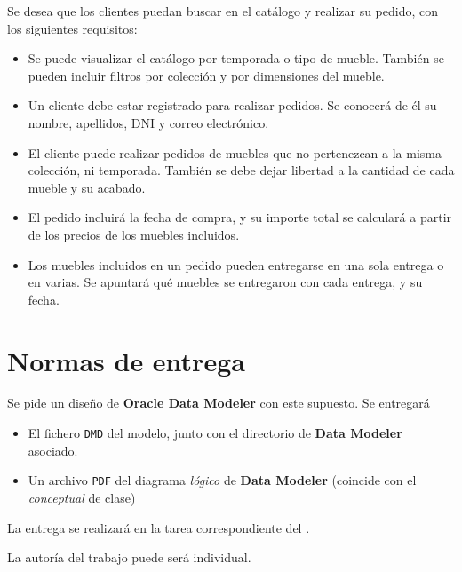 Se desea que los clientes puedan buscar en el catálogo y realizar su pedido, con los siguientes requisitos:
\begin{itemize}
\item Se puede visualizar el catálogo por temporada o tipo de mueble. También se pueden incluir filtros por colección y por dimensiones del mueble.
\item Un cliente debe estar registrado para realizar pedidos. Se conocerá de él su nombre, apellidos, DNI y correo electrónico.
\item El cliente puede realizar pedidos de muebles que no pertenezcan a la misma colección, ni temporada. También se debe dejar libertad a la cantidad de cada mueble y su acabado.
\item El pedido incluirá la fecha de compra, y su importe total se calculará a partir de los precios de los muebles incluidos.
\item Los muebles incluidos en un pedido pueden entregarse en una sola entrega o en varias. Se apuntará qué muebles se entregaron con cada entrega, y su fecha.
\end{itemize}

\section{Normas de entrega}
Se pide un diseño de \textbf{Oracle Data Modeler} con este supuesto. Se entregará
\begin{itemize}
\item  El fichero \texttt{DMD} del modelo, junto con el directorio de \textbf{Data Modeler} asociado.
\item Un archivo \texttt{PDF} del diagrama \textit{lógico} de \textbf{Data Modeler} (coincide con el \textit{conceptual} de clase)
\end{itemize}

La entrega se realizará en la tarea correspondiente del .

La autoría del trabajo puede será individual.



